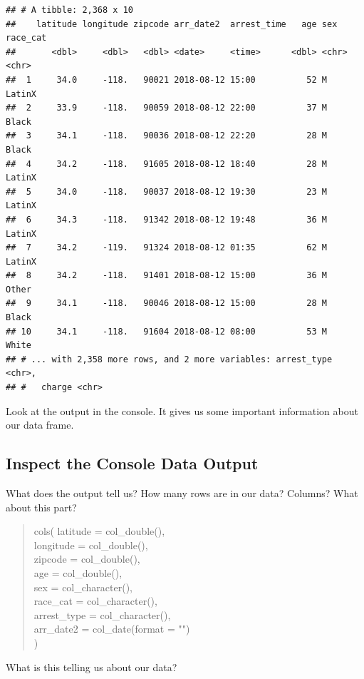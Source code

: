 \documentclass[]{book}
\begin{document}
\begin{verbatim}
## # A tibble: 2,368 x 10
##    latitude longitude zipcode arr_date2  arrest_time   age sex   race_cat
##       <dbl>     <dbl>   <dbl> <date>     <time>      <dbl> <chr> <chr>   
##  1     34.0     -118.   90021 2018-08-12 15:00          52 M     LatinX  
##  2     33.9     -118.   90059 2018-08-12 22:00          37 M     Black   
##  3     34.1     -118.   90036 2018-08-12 22:20          28 M     Black   
##  4     34.2     -118.   91605 2018-08-12 18:40          28 M     LatinX  
##  5     34.0     -118.   90037 2018-08-12 19:30          23 M     LatinX  
##  6     34.3     -118.   91342 2018-08-12 19:48          36 M     LatinX  
##  7     34.2     -119.   91324 2018-08-12 01:35          62 M     LatinX  
##  8     34.2     -118.   91401 2018-08-12 15:00          36 M     Other   
##  9     34.1     -118.   90046 2018-08-12 15:00          28 M     Black   
## 10     34.1     -118.   91604 2018-08-12 08:00          53 M     White   
## # ... with 2,358 more rows, and 2 more variables: arrest_type <chr>,
## #   charge <chr>
\end{verbatim}

Look at the output in the console. It gives us some important information about our data frame.

\begin{challenge}
\hypertarget{inspect-the-console-data-output}{%
\subsection{Inspect the Console Data
Output}\label{inspect-the-console-data-output}}

What does the output tell us? How many rows are in our data? Columns?
What about this part?

\begin{quote}
cols( latitude = col\_double(),\\
longitude = col\_double(),\\
zipcode = col\_double(),\\
age = col\_double(),\\
sex = col\_character(),\\
race\_cat = col\_character(),\\
arrest\_type = col\_character(),\\
arr\_date2 = col\_date(format = "")\\
)
\end{quote}

What is this telling us about our data?
\end{challenge}
\end{document}
